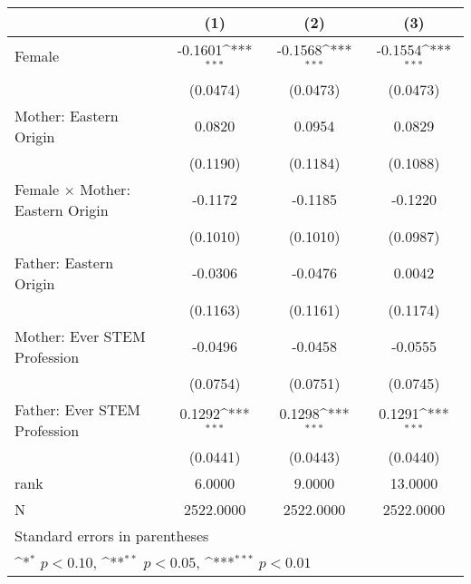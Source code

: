 {
\def\sym#1{\ifmmode^{#1}\else\(^{#1}\)\fi}
\begin{tabular}{l*{3}{c}}
\toprule
                    &\multicolumn{1}{c}{(1)}         &\multicolumn{1}{c}{(2)}         &\multicolumn{1}{c}{(3)}         \\
\midrule
Female              &     -0.1601\sym{***}&     -0.1568\sym{***}&     -0.1554\sym{***}\\
                    &    (0.0474)         &    (0.0473)         &    (0.0473)         \\
\addlinespace
Mother: Eastern Origin&      0.0820         &      0.0954         &      0.0829         \\
                    &    (0.1190)         &    (0.1184)         &    (0.1088)         \\
\addlinespace
Female $\times$ Mother: Eastern Origin&     -0.1172         &     -0.1185         &     -0.1220         \\
                    &    (0.1010)         &    (0.1010)         &    (0.0987)         \\
\addlinespace
Father: Eastern Origin&     -0.0306         &     -0.0476         &      0.0042         \\
                    &    (0.1163)         &    (0.1161)         &    (0.1174)         \\
\addlinespace
Mother: Ever STEM Profession&     -0.0496         &     -0.0458         &     -0.0555         \\
                    &    (0.0754)         &    (0.0751)         &    (0.0745)         \\
\addlinespace
Father: Ever STEM Profession&      0.1292\sym{***}&      0.1298\sym{***}&      0.1291\sym{***}\\
                    &    (0.0441)         &    (0.0443)         &    (0.0440)         \\
\midrule
rank                &      6.0000         &      9.0000         &     13.0000         \\
N                   &   2522.0000         &   2522.0000         &   2522.0000         \\
\bottomrule
\multicolumn{4}{l}{\footnotesize Standard errors in parentheses}\\
\multicolumn{4}{l}{\footnotesize \sym{*} \(p<0.10\), \sym{**} \(p<0.05\), \sym{***} \(p<0.01\)}\\
\end{tabular}
}
